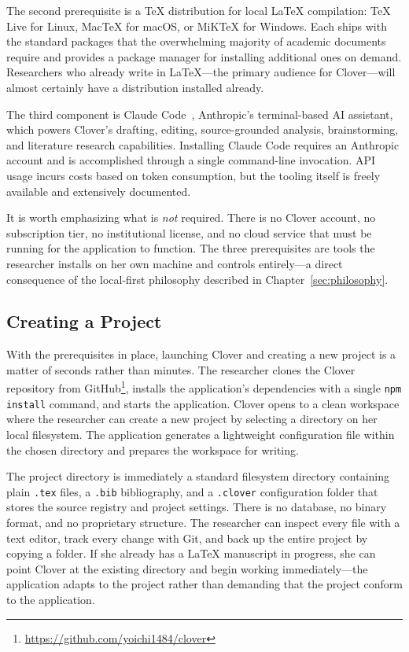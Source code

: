 \documentclass[a4paper,11pt]{article}
\begin{document}
The second prerequisite is a \TeX{} distribution for local \LaTeX{} compilation: TeX Live for Linux, MacTeX for macOS, or MiKTeX for Windows. Each ships with the standard packages that the overwhelming majority of academic documents require and provides a package manager for installing additional ones on demand. Researchers who already write in \LaTeX{}---the primary audience for Clover---will almost certainly have a distribution installed already.

The third component is Claude Code~\cite{ClaudeCode}, Anthropic's terminal-based AI assistant, which powers Clover's drafting, editing, source-grounded analysis, brainstorming, and literature research capabilities. Installing Claude Code requires an Anthropic account and is accomplished through a single command-line invocation. API usage incurs costs based on token consumption, but the tooling itself is freely available and extensively documented.

It is worth emphasizing what is \emph{not} required. There is no Clover account, no subscription tier, no institutional license, and no cloud service that must be running for the application to function. The three prerequisites are tools the researcher installs on her own machine and controls entirely---a direct consequence of the local-first philosophy described in Chapter~\ref{sec:philosophy}.

\subsection{Creating a Project}

With the prerequisites in place, launching Clover and creating a new project is a matter of seconds rather than minutes. The researcher clones the Clover repository from GitHub\footnote{\url{https://github.com/yoichi1484/clover}}, installs the application's dependencies with a single \texttt{npm install} command, and starts the application. Clover opens to a clean workspace where the researcher can create a new project by selecting a directory on her local filesystem. The application generates a lightweight configuration file within the chosen directory and prepares the workspace for writing.

The project directory is immediately a standard filesystem directory containing plain \texttt{.tex} files, a \texttt{.bib} bibliography, and a \texttt{.clover} configuration folder that stores the source registry and project settings. There is no database, no binary format, and no proprietary structure. The researcher can inspect every file with a text editor, track every change with Git, and back up the entire project by copying a folder. If she already has a \LaTeX{} manuscript in progress, she can point Clover at the existing directory and begin working immediately---the application adapts to the project rather than demanding that the project conform to the application.
\end{document}
